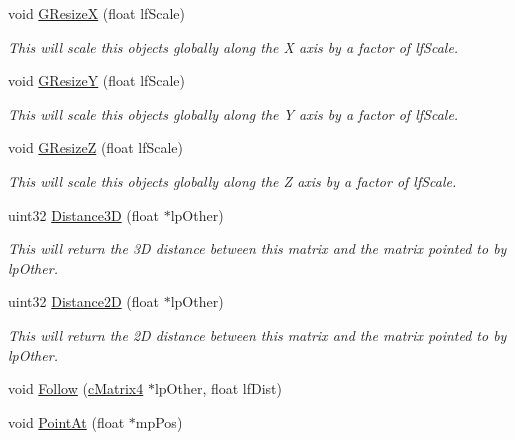 \begin{DoxyCompactItemize}
void \hyperlink{classc_camera_matrix4_a9984a8427cd90e77a2fb6462ecf99ecc}{GResizeX} (float lfScale)
\begin{DoxyCompactList}\small\item\em This will scale this objects globally along the X axis by a factor of lfScale. \item\end{DoxyCompactList}\item 
void \hyperlink{classc_camera_matrix4_aa2a9326b7f2a6f00aa5b45057c69ecd3}{GResizeY} (float lfScale)
\begin{DoxyCompactList}\small\item\em This will scale this objects globally along the Y axis by a factor of lfScale. \item\end{DoxyCompactList}\item 
void \hyperlink{classc_camera_matrix4_a1ab7808cf06ddf7ec373b926c77f85c6}{GResizeZ} (float lfScale)
\begin{DoxyCompactList}\small\item\em This will scale this objects globally along the Z axis by a factor of lfScale. \item\end{DoxyCompactList}\item 
uint32 \hyperlink{classc_camera_matrix4_adf5481b8c761008b9611e0b071e70914}{Distance3D} (float $\ast$lpOther)
\begin{DoxyCompactList}\small\item\em This will return the 3D distance between this matrix and the matrix pointed to by lpOther. \item\end{DoxyCompactList}\item 
uint32 \hyperlink{classc_camera_matrix4_a02c68197ed3c64c95985269f5b9f66a4}{Distance2D} (float $\ast$lpOther)
\begin{DoxyCompactList}\small\item\em This will return the 2D distance between this matrix and the matrix pointed to by lpOther. \item\end{DoxyCompactList}\item 
void \hyperlink{classc_camera_matrix4_aeee787e0f5895a613e8be9efbade408f}{Follow} (\hyperlink{classc_matrix4}{cMatrix4} $\ast$lpOther, float lfDist)
\item 
void \hyperlink{classc_camera_matrix4_aa8ca47d59f6b3b454d700329bdbbdeea}{PointAt} (float $\ast$mpPos)
\end{DoxyCompactItemize}
